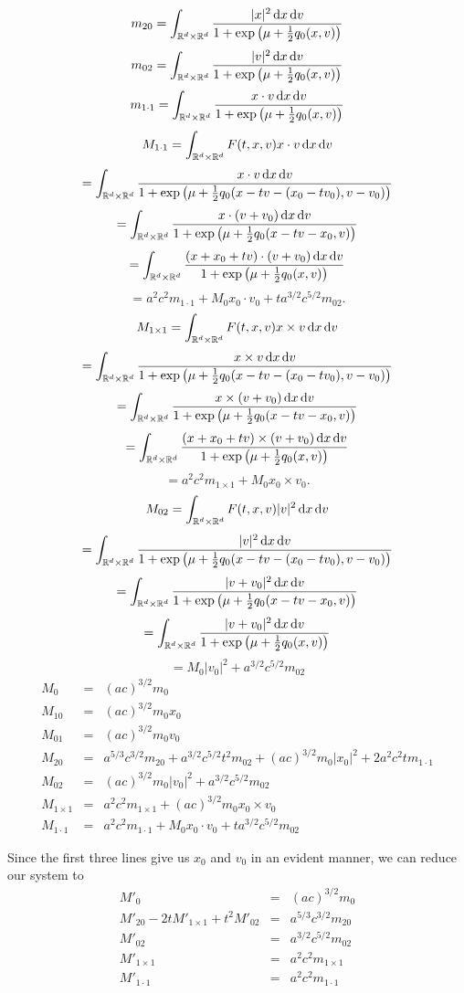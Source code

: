 \documentclass{article}
\begin{document}
\[
	m_{20} = \int_{{{\mathbb R^d}\times{\mathbb R^d}}}^{}\frac{|x|^2{\,\mathrm{d} x}{\,\mathrm{d} v}}{1+\exp\left(\mu+\frac{1}{2}q_0(x,v)\right)}
\]
\[
	m_{02} = \int_{{{\mathbb R^d}\times{\mathbb R^d}}}^{}\frac{|v|^2{\,\mathrm{d} x}{\,\mathrm{d} v}}{1+\exp\left(\mu+\frac{1}{2}q_0(x,v)\right)}
\]
\[
	m_{1\cdot1} = \int_{{{\mathbb R^d}\times{\mathbb R^d}}}^{}\frac{x\cdot v{\,\mathrm{d} x}{\,\mathrm{d} v}}{1+\exp\left(\mu+\frac{1}{2}q_0(x,v)\right)}
\]
\[
	M_{1\cdot 1}= \int_{{{\mathbb R^d}\times{\mathbb R^d}}}^{}F(t,x,v)x\cdot v{\,\mathrm{d} x}{\,\mathrm{d} v} 
\]
\[
	=\int_{{{\mathbb R^d}\times{\mathbb R^d}}}^{}\frac{x\cdot v{\,\mathrm{d} x}{\,\mathrm{d} v}}{1+\exp\left(\mu+\frac{1}{2}q_0(x-tv-(x_0-tv_0),v-v_0)\right)}
\]
\[
	=\int_{{{\mathbb R^d}\times{\mathbb R^d}}}^{}\frac{x\cdot (v+v_0){\,\mathrm{d} x}{\,\mathrm{d} v}}{1+\exp\left(\mu+\frac{1}{2}q_0(x-tv-x_0,v)\right)}
\]
\[
	=\int_{{{\mathbb R^d}\times{\mathbb R^d}}}^{}\frac{(x+x_0+tv)\cdot (v+v_0){\,\mathrm{d} x}{\,\mathrm{d} v}}{1+\exp\left(\mu+\frac{1}{2}q_0(x,v)\right)}
\]
\[
	=a^2c^2m_{1\cdot 1}+M_0 x_0\cdot v_0 + t a^{3/2}c^{5/2}m_{02}.
\]
\[
	M_{1\times 1} =\int_{{{\mathbb R^d}\times{\mathbb R^d}}}^{}F(t,x,v)x\times v{\,\mathrm{d} x}{\,\mathrm{d} v} 
\]
\[
	=\int_{{{\mathbb R^d}\times{\mathbb R^d}}}^{}\frac{x\times v{\,\mathrm{d} x}{\,\mathrm{d} v}}{1+\exp\left(\mu+\frac{1}{2}q_0(x-tv-(x_0-tv_0),v-v_0)\right)}
\]
\[
	=\int_{{{\mathbb R^d}\times{\mathbb R^d}}}^{}\frac{x\times (v+v_0){\,\mathrm{d} x}{\,\mathrm{d} v}}{1+\exp\left(\mu+\frac{1}{2}q_0(x-tv-x_0,v)\right)}
\]
\[
	=\int_{{{\mathbb R^d}\times{\mathbb R^d}}}^{}\frac{(x+x_0+tv)\times (v+v_0){\,\mathrm{d} x}{\,\mathrm{d} v}}{1+\exp\left(\mu+\frac{1}{2}q_0(x,v)\right)}
\]
\[
	=a^2c^2m_{1\times 1}+M_0 x_0\times v_0.
\]
\[
	M_{02}=\int_{{{\mathbb R^d}\times{\mathbb R^d}}}^{}F(t,x,v)|v|^2{\,\mathrm{d} x}{\,\mathrm{d} v}
\]
\[
	=\int_{{{\mathbb R^d}\times{\mathbb R^d}}}^{}\frac{|v|^2{\,\mathrm{d} x}{\,\mathrm{d} v}}{1+\exp\left(\mu+\frac{1}{2}q_0(x-tv-(x_0-tv_0),v-v_0)\right)}
\]
\[
	=\int_{{{\mathbb R^d}\times{\mathbb R^d}}}^{}\frac{|v+v_0|^2{\,\mathrm{d} x}{\,\mathrm{d} v}}{1+\exp\left(\mu+\frac{1}{2}q_0(x-tv-x_0,v)\right)}
\]
\[
	=\int_{{{\mathbb R^d}\times{\mathbb R^d}}}^{}\frac{|v+v_0|^2{\,\mathrm{d} x}{\,\mathrm{d} v}}{1+\exp\left(\mu+\frac{1}{2}q_0(x,v)\right)}
\]
\[
	=M_0|v_0|^2 + a^{3/2}c^{5/2}m_{02}	
\]
\begin{align}
	M_0&=& (ac)^{3/2}m_0\\
	M_{10}&=& (ac)^{3/2}m_0x_0\\
	M_{01}&=& (ac)^{3/2}m_0v_0\\
	M_{20}&=& a^{5/3}c^{3/2}m_{20}+a^{3/2}c^{5/2}t^2m_{02}+(ac)^{3/2}m_{0}|x_0|^2+ 2a^2c^2tm_{1\cdot1}\\
	M_{02}&=& (ac)^{3/2}m_0|v_0|^2 + a^{3/2}c^{5/2}m_{02}\\
	M_{1\times 1}&=& a^2c^2m_{1\times 1}+(ac)^{3/2}m_0 x_0\times v_0\\
	M_{1\cdot 1}&=& a^2c^2m_{1\cdot 1}+M_0 x_0\cdot v_0 + t a^{3/2}c^{5/2}m_{02}
\end{align}

Since the first three lines give us $x_0$ and $v_0$ in an evident manner, we can reduce our system to
\begin{align}
	M'_0&=& (ac)^{3/2}m_0\\
	M'_{20}-2tM'_{1\times 1}+t^2M'_{02}&=& a^{5/3}c^{3/2}m_{20}\\
	M'_{02}&=& a^{3/2}c^{5/2}m_{02}\\
	M'_{1\times 1}&=& a^2c^2m_{1\times 1}\\
	M'_{1\cdot 1}&=& a^2c^2m_{1\cdot 1}
\end{align}
\end{document}
